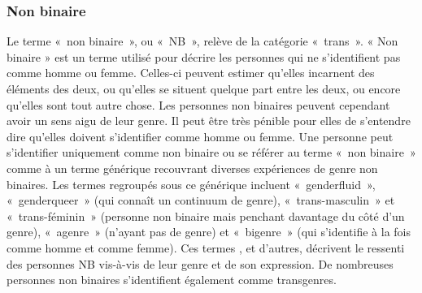 \documentclass[12pt,openany]{book}
\begin{document}
\begin{figure}[h]
    \centering
\end{figure}

\subsubsection*{Non binaire}

\noindent Le terme \mbox{« n}on binair\mbox{e »}, ou \mbox{« NB »}, relève de la catégorie \mbox{« trans »}. « Non binaire » est un terme utilisé pour décrire les personnes qui ne s’identifient pas comme homme ou femme. Celles-ci peuvent estimer qu’elles incarnent des éléments des deux, ou qu’elles se situent quelque part entre les deux, ou encore qu’elles sont tout autre chose. Les personnes non binaires peuvent cependant avoir un sens aigu de leur genre. Il peut être très pénible pour elles de s’entendre dire qu’elles doivent s’identifier comme homme ou femme. Une personne peut s’identifier uniquement comme non binaire ou se référer au terme \mbox{« n}on binair\mbox{e »} comme à un terme générique recouvrant diverses expériences de genre non binaires. Les termes regroupés sous ce générique incluent \mbox{« genderfluid »}, \mbox{« genderqueer »} (qui connaît un continuum de genre), \mbox{« t}rans-masculi\mbox{n »} et \mbox{« t}rans-fémini\mbox{n »} (personne non binaire mais penchant davantage du côté d’un genre), \mbox{« agenre »} (n’ayant pas de genre) et \mbox{« bigenre »} (qui s’identifie à la fois comme homme et comme femme). Ces termes , et d’autres, décrivent le ressenti des personnes NB vis-à-vis de leur genre et de son expression. De nombreuses personnes non binaires s’identifient également comme transgenres.
\end{document}
